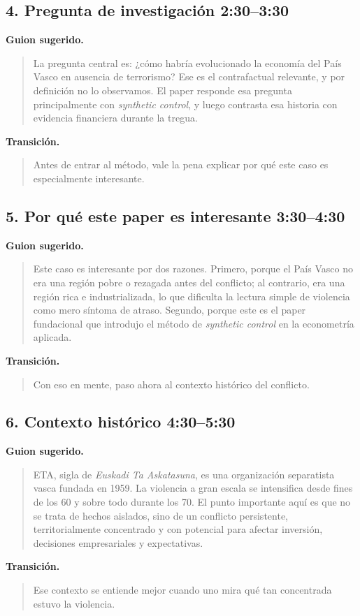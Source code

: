 \documentclass[11pt]{article}
\newcommand{\slideentry}[2]{\subsection*{#1 \hfill #2}}
\begin{document}
\slideentry{4. Pregunta de investigación}{2:30--3:30}

\textbf{Guion sugerido.}
\begin{quote}
La pregunta central es: ¿cómo habría evolucionado la economía del País Vasco en ausencia de terrorismo? Ese es el contrafactual relevante, y por definición no lo observamos. El paper responde esa pregunta principalmente con \emph{synthetic control}, y luego contrasta esa historia con evidencia financiera durante la tregua.
\end{quote}

\textbf{Transición.}
\begin{quote}
Antes de entrar al método, vale la pena explicar por qué este caso es especialmente interesante.
\end{quote}

\slideentry{5. Por qué este paper es interesante}{3:30--4:30}

\textbf{Guion sugerido.}
\begin{quote}
Este caso es interesante por dos razones. Primero, porque el País Vasco no era una región pobre o rezagada antes del conflicto; al contrario, era una región rica e industrializada, lo que dificulta la lectura simple de violencia como mero síntoma de atraso. Segundo, porque este es el paper fundacional que introdujo el método de \emph{synthetic control} en la econometría aplicada.
\end{quote}

\textbf{Transición.}
\begin{quote}
Con eso en mente, paso ahora al contexto histórico del conflicto.
\end{quote}

\slideentry{6. Contexto histórico}{4:30--5:30}

\textbf{Guion sugerido.}
\begin{quote}
ETA, sigla de \emph{Euskadi Ta Askatasuna}, es una organización separatista vasca fundada en 1959. La violencia a gran escala se intensifica desde fines de los 60 y sobre todo durante los 70. El punto importante aquí es que no se trata de hechos aislados, sino de un conflicto persistente, territorialmente concentrado y con potencial para afectar inversión, decisiones empresariales y expectativas.
\end{quote}

\textbf{Transición.}
\begin{quote}
Ese contexto se entiende mejor cuando uno mira qué tan concentrada estuvo la violencia.
\end{quote}
\end{document}
